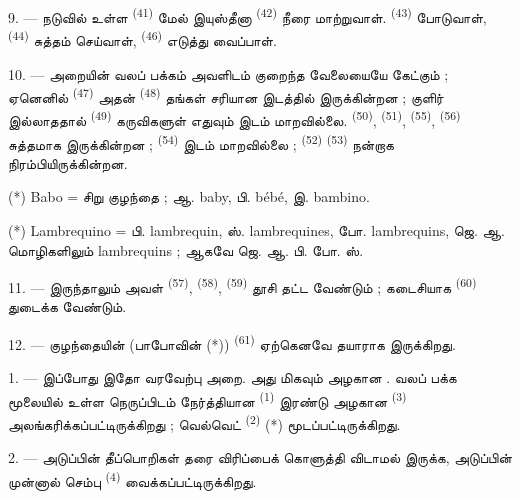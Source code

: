9. --- நடுவில் உள்ள  \textsuperscript{(41)}
மேல் இயுஸ்தீனா  \textsuperscript{(42)} நீரை
மாற்றுவாள்.  
\textsuperscript{(43)} போடுவாள், 
\textsuperscript{(44)} சுத்தம் செய்வாள், 
\textsuperscript{(46)} எடுத்து வைப்பாள்.

10. --- அறையின் வலப் பக்கம் அவளிடம் குறைந்த வேலையையே கேட்கும் ; ஏனெனில்
 \textsuperscript{(47)} அதன்
 \textsuperscript{(48)} தங்கள் சரியான இடத்தில்
இருக்கின்றன ; குளிர் இல்லாததால் 
\textsuperscript{(49)} கருவிகளுள் எதுவும் இடம் மாறவில்லை.
 \textsuperscript{(50)}, 
\textsuperscript{(51)},  \textsuperscript{(55)},
 \textsuperscript{(56)} சுத்தமாக இருக்கின்றன ;
 \textsuperscript{(54)} இடம் மாறவில்லை ;
 \textsuperscript{(52)} 
\textsuperscript{(53)} நன்றாக நிரம்பியிருக்கின்றன.

(*) Babo = சிறு குழந்தை ; ஆ. baby, பி. bébé, இ. bambino.

(*) Lambrequino = பி. lambrequin, ஸ். lambrequines, போ. lambrequins,
ஜெ. ஆ. மொழிகளிலும் lambrequins ; ஆகவே ஜெ. ஆ. பி. போ. ஸ்.

11. --- இருந்தாலும் அவள் 
\textsuperscript{(57)}, 
\textsuperscript{(58)}, 
\textsuperscript{(59)} தூசி தட்ட வேண்டும் ; கடைசியாக 
\textsuperscript{(60)} துடைக்க வேண்டும்.

12. --- குழந்தையின் (பாபோவின் (*)) 
\textsuperscript{(61)} ஏற்கெனவே தயாராக இருக்கிறது.

\VUsaut{5.0mm}
\VUsaut{3.0mm}

1. --- இப்போது இதோ வரவேற்பு அறை. அது மிகவும் அழகான .
வலப் பக்க மூலையில் உள்ள நெருப்பிடம் நேர்த்தியான 
\textsuperscript{(1)} இரண்டு அழகான 
\textsuperscript{(3)} அலங்கரிக்கப்பட்டிருக்கிறது ; வெல்வெட்
 \textsuperscript{(2)} (*)
மூடப்பட்டிருக்கிறது.

2. --- அடுப்பின் தீப்பொறிகள் தரை விரிப்பைக் கொளுத்தி விடாமல் இருக்க,
அடுப்பின் முன்னால் செம்பு 
\textsuperscript{(4)} வைக்கப்பட்டிருக்கிறது.

